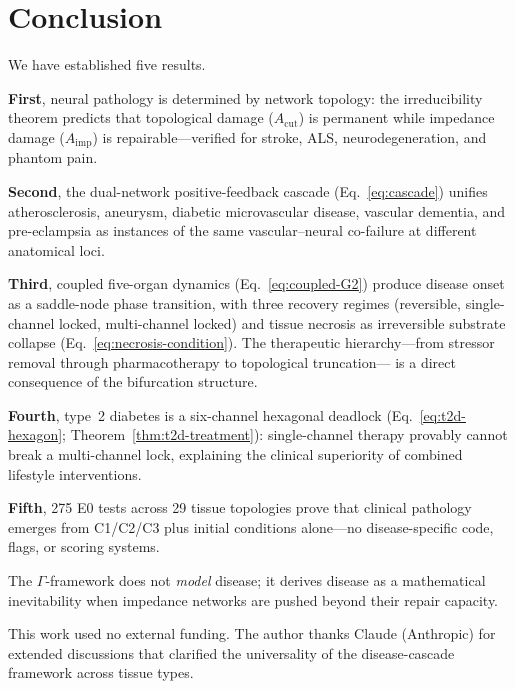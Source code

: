 \documentclass[aps,pre,twocolumn,superscriptaddress,floatfix]{revtex4-2}
\begin{document}
\section{Conclusion}
\label{sec:conclusion}

We have established five results.

\textbf{First}, neural pathology is determined by
network topology: the irreducibility theorem predicts
that topological damage ($A_{\text{cut}}$) is
permanent while impedance damage ($A_{\text{imp}}$)
is repairable---verified for stroke, ALS,
neurodegeneration, and phantom pain.

\textbf{Second}, the dual-network positive-feedback
cascade (Eq.~\ref{eq:cascade}) unifies
atherosclerosis, aneurysm, diabetic microvascular
disease, vascular dementia, and pre-eclampsia as
instances of the same vascular--neural co-failure at
different anatomical loci.

\textbf{Third}, coupled five-organ dynamics
(Eq.~\ref{eq:coupled-G2}) produce disease onset as
a saddle-node phase transition, with three recovery
regimes (reversible, single-channel locked,
multi-channel locked) and tissue necrosis as
irreversible substrate collapse
(Eq.~\ref{eq:necrosis-condition}).
The therapeutic hierarchy---from stressor removal
through pharmacotherapy to topological truncation---
is a direct consequence of the bifurcation structure.

\textbf{Fourth}, type~2 diabetes is a six-channel
hexagonal deadlock
(Eq.~\ref{eq:t2d-hexagon};
Theorem~\ref{thm:t2d-treatment}):
single-channel therapy provably cannot break a
multi-channel lock, explaining the clinical
superiority of combined lifestyle interventions.

\textbf{Fifth}, 275 E0 tests across 29 tissue
topologies prove that clinical pathology emerges
from C1/C2/C3 plus initial conditions alone---no
disease-specific code, flags, or scoring systems.

The $\Gamma$-framework does not \emph{model}
disease; it derives disease as a mathematical
inevitability when impedance networks are pushed
beyond their repair capacity.


\begin{acknowledgments}
This work used no external funding.
The author thanks Claude (Anthropic) for extended
discussions that clarified the universality of
the disease-cascade framework across tissue types.
\end{acknowledgments}
\end{document}
